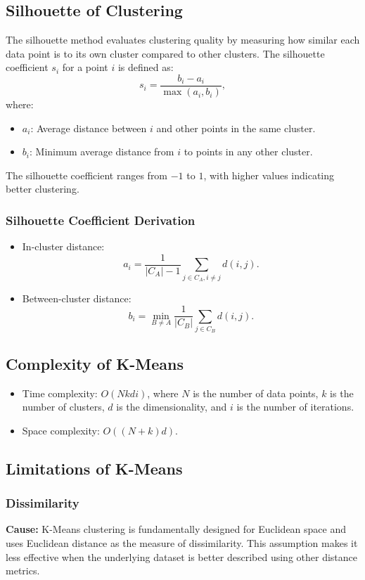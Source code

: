 \documentclass[12pt,a4paper]{article}
\begin{document}
\subsection{Silhouette of Clustering}
The silhouette method evaluates clustering quality by measuring how similar each data point is to its own cluster compared to other clusters. The silhouette coefficient \(s_i\) for a point \(i\) is defined as:
\[
s_i = \frac{b_i - a_i}{\max(a_i, b_i)},
\]
where:
\begin{itemize}
    \item \(a_i\): Average distance between \(i\) and other points in the same cluster.
    \item \(b_i\): Minimum average distance from \(i\) to points in any other cluster.
\end{itemize}
The silhouette coefficient ranges from \(-1\) to \(1\), with higher values indicating better clustering.

\subsubsection{Silhouette Coefficient Derivation}
\begin{itemize}
    \item In-cluster distance:
    \[
    a_i = \frac{1}{|C_A| - 1} \sum_{j \in C_A, i \neq j} d(i, j).
    \]
    \item Between-cluster distance:
    \[
    b_i = \min_{B \neq A} \frac{1}{|C_B|} \sum_{j \in C_B} d(i, j).
    \]
\end{itemize}

\subsection{Complexity of K-Means}
\begin{itemize}
    \item Time complexity: \(O(Nkdi)\), where \(N\) is the number of data points, \(k\) is the number of clusters, \(d\) is the dimensionality, and \(i\) is the number of iterations.
    \item Space complexity: \(O((N + k)d)\).
\end{itemize}

\subsection{Limitations of K-Means}

\subsubsection{Dissimilarity}
\textbf{Cause:}
K-Means clustering is fundamentally designed for Euclidean space and uses Euclidean distance as the measure of dissimilarity. This assumption makes it less effective when the underlying dataset is better described using other distance metrics.
\end{document}
